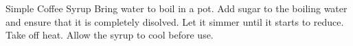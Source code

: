 \documentclass[../main.tex]{subfiles}
\begin{document}
\begin{recipe}{Simple Coffee Syrup}{}{}
    Bring water to boil in a pot.
    Add sugar to the boiling water and ensure that it is completely disolved.
    Let it simmer until it starts to reduce. Take off heat. Allow the syrup to
    cool before use.
\end{recipe}
\end{document}
